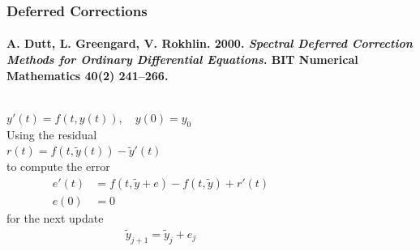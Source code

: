 \documentclass[%
  english,
  hyperref={pdfpagelabels=false},
  aspectratio=1610]{beamer}
\begin{document}
\begin{frame}
  \frametitle{Deferred Corrections \hspace{2em} }
  \framesubtitle{
    \normalfont\tiny
           {A. Dutt, L. Greengard, V. Rokhlin. 2000. \emph{Spectral Deferred Correction Methods for Ordinary Differential Equations}. BIT Numerical Mathematics 40(2) 241–266.}%
  }
  \begin{columns}[T]
    \begin{column}{7cm}
      $ y'(t) = f\left( t, y\left( t \right) \right),\quad y\left( 0 \right)= y_{0} $\\[1.5em]
      Using the residual\\[1em]
      $r(t) = f\left( t, \tilde y\left( t \right) \right) - \tilde y'\left( t \right)$\\[1em]
      to compute the error
      \begin{align*}
        e'(t) &= f(t,\tilde y + e) - f\left( t, \tilde y \right) + r'\left( t \right)\\
        e(0)  &= 0
      \end{align*}
      for the next update
      \begin{align*}
        \tilde y_{j+1} = \tilde y_{j} + e_{j}
      \end{align*}
    \end{column}
    \begin{column}{7cm}

    \end{column}
  \end{columns}
\end{frame}
\end{document}
